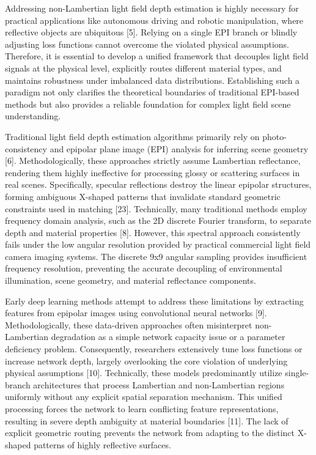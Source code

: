 Addressing non-Lambertian light field depth estimation is highly necessary for practical applications like autonomous driving and robotic manipulation, where reflective objects are ubiquitous [5]. Relying on a single EPI branch or blindly adjusting loss functions cannot overcome the violated physical assumptions. Therefore, it is essential to develop a unified framework that decouples light field signals at the physical level, explicitly routes different material types, and maintains robustness under imbalanced data distributions. Establishing such a paradigm not only clarifies the theoretical boundaries of traditional EPI-based methods but also provides a reliable foundation for complex light field scene understanding.

Traditional light field depth estimation algorithms primarily rely on photo-consistency and epipolar plane image (EPI) analysis for inferring scene geometry [6]. Methodologically, these approaches strictly assume Lambertian reflectance, rendering them highly ineffective for processing glossy or scattering surfaces in real scenes. Specifically, specular reflections destroy the linear epipolar structures, forming ambiguous X-shaped patterns that invalidate standard geometric constraints used in matching [23]. Technically, many traditional methods employ frequency domain analysis, such as the 2D discrete Fourier transform, to separate depth and material properties [8]. However, this spectral approach consistently fails under the low angular resolution provided by practical commercial light field camera imaging systems. The discrete 9x9 angular sampling provides insufficient frequency resolution, preventing the accurate decoupling of environmental illumination, scene geometry, and material reflectance components.

Early deep learning methods attempt to address these limitations by extracting features from epipolar images using convolutional neural networks [9]. Methodologically, these data-driven approaches often misinterpret non-Lambertian degradation as a simple network capacity issue or a parameter deficiency problem. Consequently, researchers extensively tune loss functions or increase network depth, largely overlooking the core violation of underlying physical assumptions [10]. Technically, these models predominantly utilize single-branch architectures that process Lambertian and non-Lambertian regions uniformly without any explicit spatial separation mechanism. This unified processing forces the network to learn conflicting feature representations, resulting in severe depth ambiguity at material boundaries [11]. The lack of explicit geometric routing prevents the network from adapting to the distinct X-shaped patterns of highly reflective surfaces.

